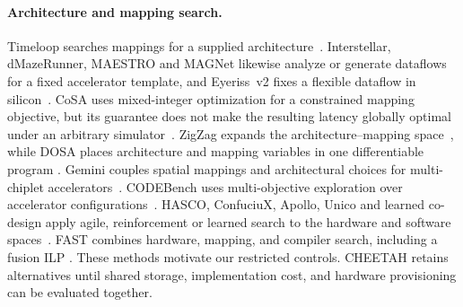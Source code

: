 \paragraph{Architecture and mapping search.}
Timeloop searches mappings for a supplied architecture~\citep{timeloop}.
Interstellar, dMazeRunner, MAESTRO and MAGNet likewise analyze or generate dataflows for a fixed accelerator template, and Eyeriss~v2 fixes a flexible dataflow in silicon~\citep{yang_interstellar,dave2019dmazerunner,kwon2020understandingreuseperformancehardware,venkatesan2019magnet,chen2019eyerissv2flexibleaccelerator}.
CoSA uses mixed-integer optimization for a constrained mapping objective, but its guarantee does not make the resulting latency globally optimal under an arbitrary simulator~\citep{huang2021cosaschedulingconstrainedoptimization}.
ZigZag expands the architecture--mapping space~\citep{mei2021zigzag}, while DOSA places architecture and mapping variables in one differentiable program \citep{hong2023dosa}.
Gemini couples spatial mappings and architectural choices for multi-chiplet accelerators~\citep{cai2024gemini}.
CODEBench uses multi-objective exploration over accelerator configurations~\citep{Tuli_2023}.
HASCO, ConfuciuX, Apollo, Unico and learned co-design apply agile, reinforcement or learned search to the hardware and software spaces~\citep{xiao2021hasco,kao2020confuciuxautonomoushardwareresource,yazdanbakhsh2021apollotransferablearchitectureexploration,rashidi2023unico,shi2020learnedhardwaresoftwarecodesignneural}.
FAST combines hardware, mapping, and compiler search, including a fusion ILP \citep{zhang_fast}.
These methods motivate our restricted controls.
CHEETAH retains alternatives until shared storage, implementation cost, and hardware provisioning can be evaluated together.

